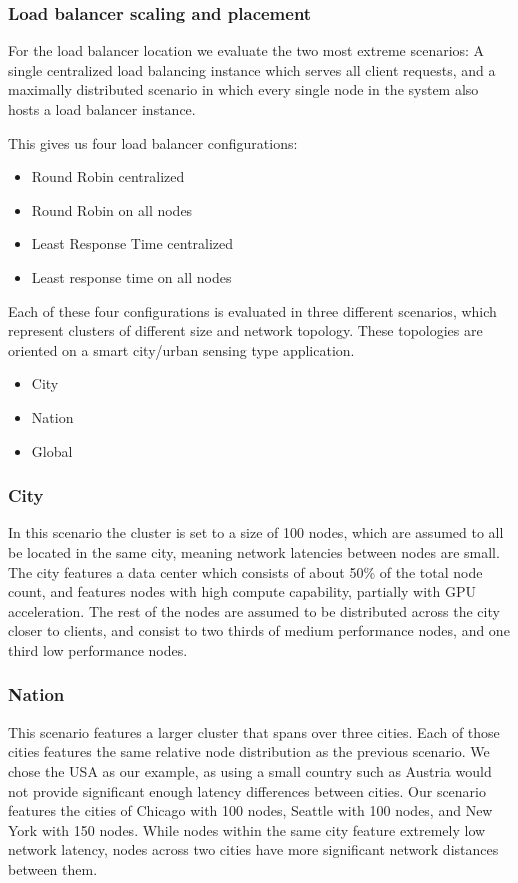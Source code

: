 \subsubsection{Load balancer scaling and placement}
For the load balancer location we evaluate the two most extreme scenarios: A single centralized load balancing instance which serves all client requests, and a maximally distributed scenario in which every single node in the system also hosts a load balancer instance.

This gives us four load balancer configurations:
\begin{itemize}
    \item Round Robin centralized
    \item Round Robin on all nodes
    \item Least Response Time centralized
    \item Least response time on all nodes
\end{itemize}

Each of these four configurations is evaluated in three different scenarios, which represent clusters of different size and network topology.
These topologies are oriented on a smart city/urban sensing type application.
\begin{itemize}
    \item City
    \item Nation
    \item Global
\end{itemize}
\subsubsection{City}
In this scenario the cluster is set to a size of 100 nodes, which are assumed to all be located in the same city, meaning network latencies between nodes are small.
The city features a data center which consists of about 50\% of the total node count, and features nodes with high compute capability, partially with GPU acceleration.
The rest of the nodes are assumed to be distributed across the city closer to clients, and consist to two thirds of medium performance nodes, and one third low performance nodes.
\subsubsection{Nation}
This scenario features a larger cluster that spans over three cities.
Each of those cities features the same relative node distribution as the previous scenario.
We chose the USA as our example, as using a small country such as Austria would not provide significant enough latency differences between cities.
Our scenario features the cities of Chicago with 100 nodes, Seattle with 100 nodes, and New York with 150 nodes.
While nodes within the same city feature extremely low network latency, nodes across two cities have more significant network distances between them.

